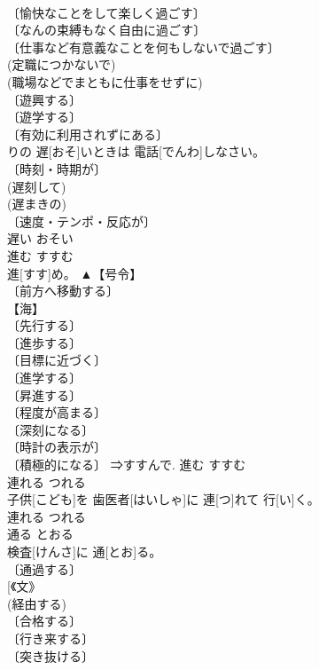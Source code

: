 \documentclass[8pt]{extreport}
\begin{document}
\begin{CJK}{UTF8}{min}
\\	〔愉快なことをして楽しく過ごす〕 
\\	〔なんの束縛もなく自由に過ごす〕 
\\	〔仕事など有意義なことを何もしないで過ごす〕 
\\	(定職につかないで) 
\\	(職場などでまともに仕事をせずに) 
\\	〔遊興する〕 
\\	〔遊学する〕 
\\	〔有効に利用されずにある〕 
\\	[⇒あそばせる 
\\	〔もてあそぶ〕	遊ぶ	あそぶ	
\\	遅い	おそい	
\\	帰[かえ]りの 遅[おそ]いときは 電話[でんわ]しなさい。	
\\	〔時刻・時期が〕 
\\	(遅刻して) 
\\	(遅まきの) 
\\	〔速度・テンポ・反応が〕 
\\	遅い	おそい	
\\	進む	すすむ	
\\	進[すす]め。	▲【号令】 
\\	〔前方へ移動する〕 
\\	【海】 
\\	〔先行する〕 
\\	〔進歩する〕 
\\	〔目標に近づく〕 
\\	〔進学する〕 
\\	〔昇進する〕 
\\	〔程度が高まる〕 
\\	〔深刻になる〕 
\\	〔時計の表示が〕 
\\	〔積極的になる〕 ⇒すすんで.	進む	すすむ	
\\	連れる	つれる	
\\	子供[こども]を 歯医者[はいしゃ]に 連[つ]れて 行[い]く。	
\\	連れる	つれる	
\\	通る	とおる	
\\	検査[けんさ]に 通[とお]る。	
\\	〔通過する〕 
\\	[《文》 
\\	(経由する) 
\\	〔合格する〕 
\\	〔行き来する〕 
\\	〔突き抜ける〕 

\end{CJK}
\end{document}
